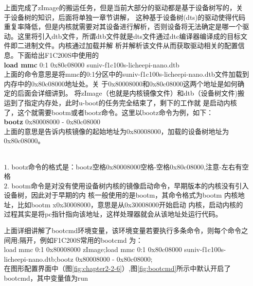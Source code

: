上面完成了zImage的搬运任务，但是当前大部分的驱动都是基于设备树写的，关于设备树的知识，后面将单独一章节讲解，
这种基于设备树(dts)的驱动使得代码重复率降低，但是内核就需要对其设备进行解析，否则设备将无法确定是哪一个驱
动。这里将引入dtb文件，所谓dtb文件就是dts文件通过dtc编译器编译成的目标文件即二进制文件。内核通过加载并解
析并解析该文件从而获取驱动相关的配置信息。下面给出F1C200S中使用的\\
\textbf{load mmc} 0:1 0x80c08000 suniv-f1c100s-licheepi-nano.dtb \\
上面的命令意思是将mmc的0:1分区中的suniv-f1c100s-licheepi-nano.dtb文件加载到内存中的0x80c08000地址处。关
于0x80008000和0x80c08000这两个地址是如何确定的后面会详细讲到。
将zImage（也就是内核镜像文件）和dtb（设备树文件)搬运到了指定内存处，此时u-boot的任务完全结束了，剩下的工作就
是启动内核了，这个就需要bootm或者bootz命令。这里以bootz命令为例，如下：\\
\textbf{bootz} 0x80008000 - 0x80c08000 \\
上面的意思是告诉内核镜像的起始地址为0x80008000，加载的设备树地址为0x80c08000。
\begin{tcolorbox}[colback=red!5!white,colframe=red!75!black]
	\faWarning \  \\
	$1.$  bootz命令的格式是：bootz空格0x80008000空格-空格0x80c08000,注意-左右有空格\\
	$2.$  bootm命令是对没有使用设备树内核的镜像启动命令，早期版本的内核没有引入设备树，因此对于早期的内
	核一般使用的是bootm，其命令格式为bootm 内核地址，比如bootm x0x30008000，意思是从0x30008000开始启动
	内核，启动内核的过程其实是将pc指针指向该地址，这样处理器就会从该地址处运行代码。
\end{tcolorbox}
上面详细讲解了bootcmd环境变量，该环境变量若要执行多条命令，则每个命令之间用;隔开，例如F1C200S常用的bootcmd
为：\\
load mmc 0:1 0x80008000 zImage;load mmc 0:1 0x80c08000 suniv-f1c100s-licheepi-nano.dtb;bootz 
0x80008000 - 0x80c08000;\\
在图形配置界面中（图\ref{fig:chapter2-2-6}）,图\ref{fig:bootcmd}所示中默认开启了bootcmd，其中变量值为run
 
